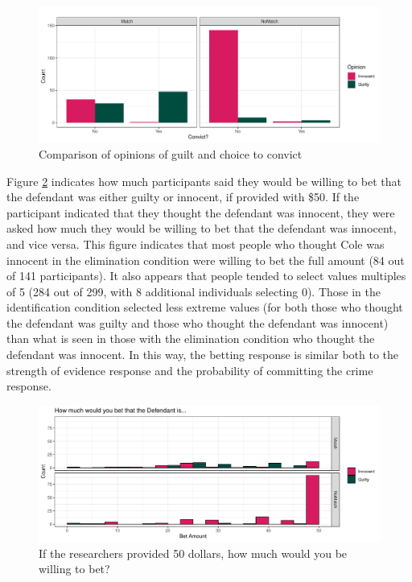 \documentclass[print]{nuthesis}
\begin{document}
\begin{figure}

{\centering \includegraphics[width=\linewidth]{thesis_files/figure-latex/opinionguilt-1} 

}

\caption{Comparison of opinions of guilt and choice to convict}\label{fig:opinionguilt}
\end{figure}

Figure \ref{fig:betting} indicates how much participants said they would be willing to bet that the defendant was either guilty or innocent, if provided with \$50.
If the participant indicated that they thought the defendant was innocent, they were asked how much they would be willing to bet that the defendant was innocent, and vice versa.
This figure indicates that most people who thought Cole was innocent in the elimination condition were willing to bet the full amount (84 out of 141 participants).
It also appears that people tended to select values multiples of 5 (284 out of 299, with 8 additional individuals selecting 0).
Those in the identification condition selected less extreme values (for both those who thought the defendant was guilty and those who thought the defendant was innocent) than what is seen in those with the elimination condition who thought the defendant was innocent.
In this way, the betting response is similar both to the strength of evidence response and the probability of committing the crime response.

\begin{figure}

{\centering \includegraphics[width=\linewidth]{thesis_files/figure-latex/betting-1} 

}

\caption{If the researchers provided 50 dollars, how much would you be willing to bet?}\label{fig:betting}
\end{figure}
\end{document}
